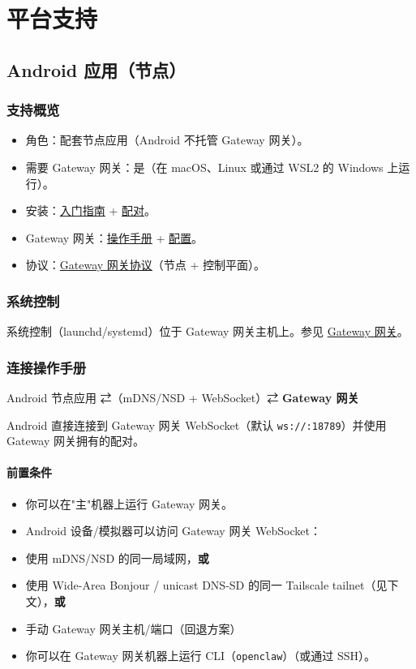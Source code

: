\chapter{平台支持}

\section{Android 应用（节点）}


\subsection{支持概览}


\begin{itemize}
  \item 角色：配套节点应用（Android 不托管 Gateway 网关）。
  \item 需要 Gateway 网关：是（在 macOS、Linux 或通过 WSL2 的 Windows 上运行）。
  \item 安装：\href{/start/getting-started}{入门指南} + \href{/gateway/pairing}{配对}。
  \item Gateway 网关：\href{/gateway}{操作手册} + \href{/gateway/configuration}{配置}。
  \item 协议：\href{/gateway/protocol}{Gateway 网关协议}（节点 + 控制平面）。
\end{itemize}


\subsection{系统控制}


系统控制（launchd/systemd）位于 Gateway 网关主机上。参见 \href{/gateway}{Gateway 网关}。

\subsection{连接操作手册}


Android 节点应用 ⇄（mDNS/NSD + WebSocket）⇄ \textbf{Gateway 网关}

Android 直接连接到 Gateway 网关 WebSocket（默认 \texttt{ws://:18789}）并使用 Gateway 网关拥有的配对。

\subsubsection{前置条件}


\begin{itemize}
  \item 你可以在"主"机器上运行 Gateway 网关。
  \item Android 设备/模拟器可以访问 Gateway 网关 WebSocket：
  \item 使用 mDNS/NSD 的同一局域网，\textbf{或}
  \item 使用 Wide-Area Bonjour / unicast DNS-SD 的同一 Tailscale tailnet（见下文），\textbf{或}
  \item 手动 Gateway 网关主机/端口（回退方案）
  \item 你可以在 Gateway 网关机器上运行 CLI（\texttt{openclaw}）（或通过 SSH）。
\end{itemize}


